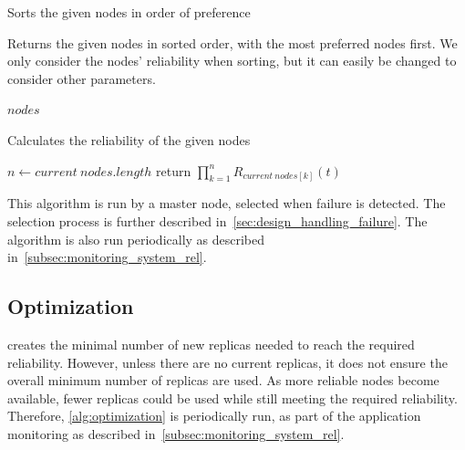 \documentclass{cslthse-msc}
\begin{document}
\begin{function} 
	\caption{Sorts the given nodes in order of preference} \label{func:sort}
	Returns the given nodes in sorted order, with the most preferred nodes first. We only consider the nodes' reliability when sorting, but it can easily be changed to consider other parameters.
	\begin{algorithmic}[1]
	\Statex
		\Statex{}
		\State
	    \State \Return $nodes$
	\EndFunction
	\end{algorithmic}
\end{function}

\begin{function} 
	\caption{Calculates the reliability of the given nodes} \label{func:calc_reliability}
	\begin{algorithmic}[1]
	\Statex
		\State $n\gets current\ nodes.length$
		\State return $ \prod\limits_{k=1}^n R_{current\ nodes[k]}(t)$
	\EndFunction
	\end{algorithmic}
\end{function}

This algorithm is run by a master node, selected when failure is detected. The selection process is further described in~\cref{sec:design_handling_failure}. The algorithm is also run periodically as described in~\cref{subsec:monitoring_system_rel}.

\subsection{Optimization} \label{subsec:design_optimization}
 creates the minimal number of new replicas needed to reach the required reliability. However, unless there are no current replicas, it does not ensure the overall minimum number of replicas are used. As more reliable nodes become available, fewer replicas could be used while still meeting the required reliability. Therefore, \cref{alg:optimization} is periodically run, as part of the application monitoring as described in~\cref{subsec:monitoring_system_rel}.
\end{document}
